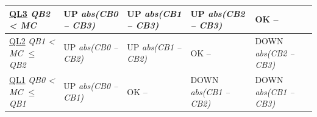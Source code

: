 \bigskip

\begin{minipage}{\linewidth}
\begin{tabularx}
  {\textwidth}
  { X | X | X | X | X }
  \toprule
      \centering \hspace{4mm} \uline{QL3} \newline \footnotesize \textit{QB2 \textless{} MC} 
    & \centering \hspace{4mm} UP \newline \footnotesize \textit{abs(CB0 -- CB3)} 
    & \centering \hspace{4mm} UP \newline \footnotesize \textit{abs(CB1 -- CB3)} 
    & \centering \hspace{4mm} UP \newline \footnotesize \textit{abs(CB2 -- CB3)} 
    & \centering \hspace{4mm} OK \newline -- 
    \tabularnewline
  \hline
      \centering \hspace{4mm} \uline{QL2} \newline \footnotesize \textit{QB1 \textless{} MC $\leq$ QB2} 
    & \centering \hspace{4mm} UP \newline \footnotesize \textit{abs(CB0 -- CB2)} 
    & \centering \hspace{4mm} UP \newline \footnotesize \textit{abs(CB1 -- CB2)} 
    & \centering \hspace{4mm} OK \newline -- 
    & \centering \hspace{4mm} DOWN \newline \footnotesize \textit{abs(CB2 -- CB3)} 
    \tabularnewline
  \hline
      \centering \hspace{4mm} \uline{QL1} \newline \footnotesize \textit{QB0 \textless{} MC $\leq$ QB1} 
    & \centering \hspace{4mm} UP \newline \footnotesize \textit{abs(CB0 -- CB1)} 
    & \centering \hspace{4mm} OK \newline -- 
    & \centering \hspace{4mm} DOWN \newline \footnotesize \textit{abs(CB1 -- CB2)} 
    & \centering \hspace{4mm} DOWN \newline \footnotesize \textit{abs(CB1 -- CB3)} 

\end{tabularx}
\end{minipage}
